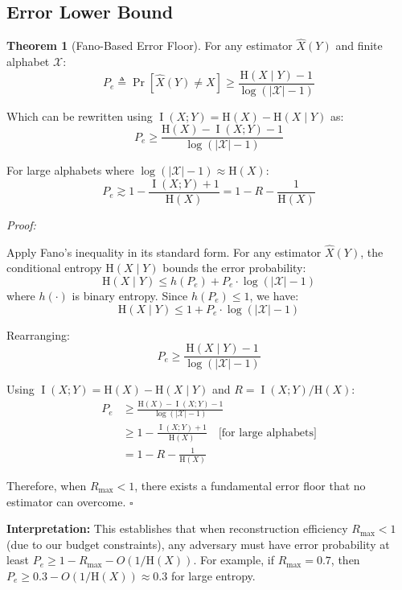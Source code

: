 \documentclass[11pt,a4paper]{article}
\theoremstyle{definition}
\newtheorem{theorem}{Theorem}[section]
\DeclareMathOperator{\I}{I}
\newcommand{\Entropy}{\mathrm{H}}
\newcommand{\given}{\mid}
\begin{document}
\subsection{Error Lower Bound}

\begin{theorem}[Fano-Based Error Floor]\label{thm:fano}
For any estimator $\hat{X}(Y)$ and finite alphabet $\mathcal{X}$:
\[
P_e \triangleq \Pr[\hat{X}(Y) \neq X] \geq \frac{\Entropy(X \given Y) - 1}{\log(|\mathcal{X}| - 1)}
\]

Which can be rewritten using $\I(X; Y) = \Entropy(X) - \Entropy(X \given Y)$ as:
\[
P_e \geq \frac{\Entropy(X) - \I(X; Y) - 1}{\log(|\mathcal{X}| - 1)}
\]

For large alphabets where $\log(|\mathcal{X}| - 1) \approx \Entropy(X)$:
\[
P_e \gtrsim 1 - \frac{\I(X; Y) + 1}{\Entropy(X)} = 1 - R - \frac{1}{\Entropy(X)}
\]
\end{theorem}

\textit{Proof:}

Apply Fano's inequality in its standard form. For any estimator $\hat{X}(Y)$, the conditional entropy $\Entropy(X \given Y)$ bounds the error probability:
\[
\Entropy(X \given Y) \leq h(P_e) + P_e \cdot \log(|\mathcal{X}| - 1)
\]
where $h(\cdot)$ is binary entropy. Since $h(P_e) \leq 1$, we have:
\[
\Entropy(X \given Y) \leq 1 + P_e \cdot \log(|\mathcal{X}| - 1)
\]

Rearranging:
\[
P_e \geq \frac{\Entropy(X \given Y) - 1}{\log(|\mathcal{X}| - 1)}
\]

Using $\I(X; Y) = \Entropy(X) - \Entropy(X \given Y)$ and $R = \I(X; Y)/\Entropy(X)$:
\begin{align}
P_e &\geq \frac{\Entropy(X) - \I(X; Y) - 1}{\log(|\mathcal{X}| - 1)} \\
&\geq 1 - \frac{\I(X; Y) + 1}{\Entropy(X)} \quad \text{[for large alphabets]} \\
&= 1 - R - \frac{1}{\Entropy(X)}
\end{align}

Therefore, when $R_{\max} < 1$, there exists a fundamental error floor that no estimator can overcome. $\square$

\textbf{Interpretation:} This establishes that when reconstruction efficiency $R_{\max} < 1$ (due to our budget constraints), any adversary must have error probability at least $P_e \geq 1 - R_{\max} - O(1/\Entropy(X))$. For example, if $R_{\max} = 0.7$, then $P_e \geq 0.3 - O(1/\Entropy(X)) \approx 0.3$ for large entropy.
\end{document}
